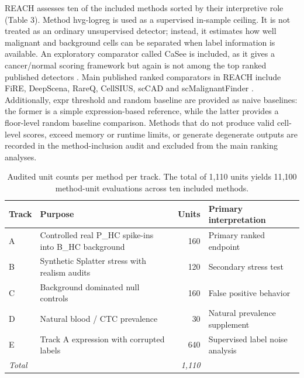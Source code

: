 \documentclass[10pt]{article}
\begin{document}
REACH assesses ten of the included methods sorted by their interpretive role (Table 3). Method hvg-logreg is used as a supervised in-sample ceiling. It is not treated as an ordinary unsupervised detector; instead, it estimates how well malignant and background cells can be separated when label information is available. An exploratory comparator called CaSee is included, as it gives a cancer/normal scoring framework but again is not among the top ranked published detectors \cite{sh2022casee}. Main published ranked comparators in REACH include FiRE, DeepScena, RareQ, CellSIUS, scCAD and scMalignantFinder \cite{wegmann2019cellsius,xu2024sccad,yu2025scmalignantfinder}. Additionally, expr threshold and random baseline are provided as naive baselines: the former is a simple expression-based reference, while the latter provides a floor-level random baseline comparison. Methods that do not produce valid cell-level scores, exceed memory or runtime limits, or generate degenerate outputs are recorded in the method-inclusion audit and excluded from the main ranking analyses.


\begin{table}[H]
\centering
\caption{Audited unit counts per method per track. The total of 1{,}110
units yields 11{,}100 method-unit evaluations across ten included
methods.}
\label{tab:tracks}
\small
\begin{tabular}{llrl}
\toprule
Track & Purpose & Units & Primary interpretation \\
\midrule
A & Controlled real P\_HC spike-ins into B\_HC background & 160 & Primary ranked endpoint \\
B & Synthetic Splatter stress with realism audits         & 120 & Secondary stress test \\
C & Background dominated null controls                    & 160 & False positive behavior \\
D & Natural blood / CTC prevalence                        & 30  & Natural prevalence supplement \\
E & Track A expression with corrupted labels              & 640 & Supervised label noise analysis \\
\midrule
\multicolumn{2}{l}{\textit{Total}} & \textit{1{,}110} & \\
\bottomrule
\end{tabular}
\end{table}
\end{document}
